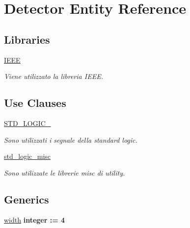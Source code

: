 \hypertarget{classDetector}{}\section{Detector Entity Reference}
\label{classDetector}
\subsection*{Libraries}
 \begin{DoxyCompactItemize}
\item 
\mbox{\label{classDetector_a7b79fa0a00791047ccb81eee6672bb5c}} 
\hyperlink{classDetector_a7b79fa0a00791047ccb81eee6672bb5c}{I\+E\+EE} 
\begin{DoxyCompactList}\small\item\em Viene utilizzato la libreria I\+E\+EE. \end{DoxyCompactList}\end{DoxyCompactItemize}
\subsection*{Use Clauses}
 \begin{DoxyCompactItemize}
\item 
\mbox{\label{classDetector_a159df90fd1157a6af47ee8417376d36d}} 
\hyperlink{classDetector_a159df90fd1157a6af47ee8417376d36d}{S\+T\+D\+\_\+\+L\+O\+G\+I\+C\+\_}   
\begin{DoxyCompactList}\small\item\em Sono utilizzati i segnale della standard logic. \end{DoxyCompactList}\item 
\mbox{\label{classDetector_a9f9f4556b2a5ddfdc5f748ead85bae54}} 
\hyperlink{classDetector_a9f9f4556b2a5ddfdc5f748ead85bae54}{std\+\_\+logic\+\_\+misc}   
\begin{DoxyCompactList}\small\item\em Sono utilizzate le librerie misc di utility. \end{DoxyCompactList}\end{DoxyCompactItemize}
\subsection*{Generics}
 \begin{DoxyCompactItemize}
\item 
\mbox{\label{classDetector_aa22c64c9ea3a96fe2bcdb5428fe1a1ee}} 
\hyperlink{classDetector_aa22c64c9ea3a96fe2bcdb5428fe1a1ee}{width} {\bfseries {\bfseries \textcolor{vhdlchar}{integer}\textcolor{vhdlchar}{ }\textcolor{vhdlchar}{\+:}\textcolor{vhdlchar}{=}\textcolor{vhdlchar}{ } \textcolor{vhdldigit}{4} \textcolor{vhdlchar}{ }}}
\end{DoxyCompactItemize}
